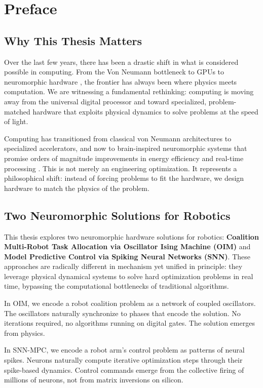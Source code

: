 \chapter{Preface}
\label{ch:preface}

\section*{Why This Thesis Matters}

Over the last few years, there has been a drastic shift in what is considered possible in computing. From the Von Neumann bottleneck \cite{Backus1978} to GPUs \cite{Nickolls2008} to neuromorphic hardware \cite{Furber2016}, the frontier has always been where physics meets computation. We are witnessing a fundamental rethinking: computing is moving away from the universal digital processor and toward specialized, problem-matched hardware that exploits physical dynamics to solve problems at the speed of light.

Computing has transitioned from classical von Neumann architectures to specialized accelerators, and now to brain-inspired neuromorphic systems that promise orders of magnitude improvements in energy efficiency and real-time processing \cite{Indiveri2015}. This is not merely an engineering optimization. It represents a philosophical shift: instead of forcing problems to fit the hardware, we design hardware to match the physics of the problem.

\section*{Two Neuromorphic Solutions for Robotics}

This thesis explores two neuromorphic hardware solutions for robotics: \textbf{Coalition Multi-Robot Task Allocation via Oscillator Ising Machine (OIM)} and \textbf{Model Predictive Control via Spiking Neural Networks (SNN)}. These approaches are radically different in mechanism yet unified in principle: they leverage physical dynamical systems to solve hard optimization problems in real time, bypassing the computational bottlenecks of traditional algorithms.

In OIM, we encode a robot coalition problem as a network of coupled oscillators. The oscillators naturally synchronize to phases that encode the solution. No iterations required, no algorithms running on digital gates. The solution emerges from physics.

In SNN-MPC, we encode a robot arm's control problem as patterns of neural spikes. Neurons naturally compute iterative optimization steps through their spike-based dynamics. Control commands emerge from the collective firing of millions of neurons, not from matrix inversions on silicon.

